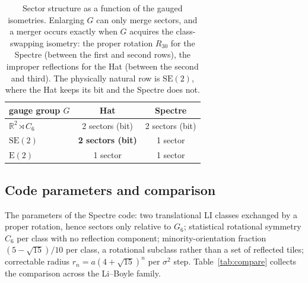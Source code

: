 \documentclass[a4paper,unpublished]{quantumarticle}
\theoremstyle{remark}
\newcommand{\RR}{\mathbb{R}}
\newcommand{\Etwo}{\mathrm{E}(2)}
\newcommand{\SEtwo}{\mathrm{SE}(2)}
\begin{document}
\begin{table}[t]
\centering
\begin{tabular}{@{}lcc@{}}
\toprule
gauge group $G$ & Hat & Spectre \\
\midrule
$\RR^{2} \rtimes C_{6}$ & 2 sectors (bit) & 2 sectors (bit) \\
$\SEtwo$                 & \textbf{2 sectors (bit)} & 1 sector \\
$\Etwo$                  & 1 sector & 1 sector \\
\bottomrule
\end{tabular}
\caption{Sector structure as a function of the gauged isometries.
Enlarging $G$ can only merge sectors, and a merger occurs exactly
when $G$ acquires the class-swapping isometry: the proper rotation
$R_{30}$ for the Spectre (between the first and second rows), the
improper reflections for the Hat (between the second and third). The
physically natural row is $\SEtwo$, where the Hat keeps its bit and
the Spectre does not.}
\label{tab:gauge}
\end{table}

\subsection{Code parameters and comparison}
\label{sec:spec-params}

The parameters of the Spectre code: two translational LI classes
exchanged by a proper rotation, hence sectors only relative to
$G_{6}$; statistical rotational symmetry $C_{6}$ per class with no
reflection component; minority-orientation fraction
$(5-\sqrt{15})/10$ per class, a rotational subclass rather than a
set of reflected tiles; correctable radius
$r_{n} = a (4+\sqrt{15})^{n}$ per $\sigma^{2}$ step.
Table~\ref{tab:compare} collects the comparison across the Li--Boyle
family.
\end{document}

